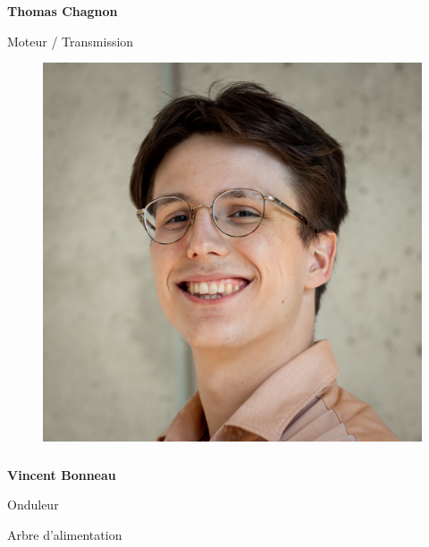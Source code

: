 \documentclass[a0paper,portrait]{baposter}
\begin{document}
\begin{poster}
{\subsubsection*{}
\vspace{2mm}
\textbf{Thomas Chagnon}

Moteur / Transmission

\begin{figure}
\includegraphics[width=.9\linewidth]{img/membres/Vincent-Bonneau-3.jpg} 
\end{figure}
\subsubsection*{}
\vspace{2mm}
\textbf{Vincent Bonneau}

Onduleur

Arbre d'alimentation

}
\end{poster}
\end{document}

